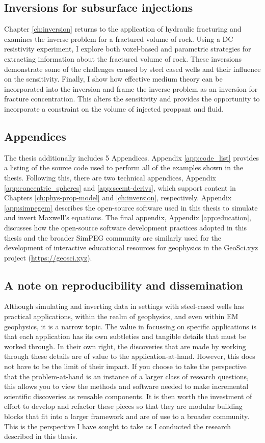 \subsection{Inversions for subsurface injections}
Chapter \ref{ch:inversion} returns to the application of hydraulic fracturing and examines the inverse problem for a fractured volume of rock. Using a DC resistivity experiment, I explore both voxel-based and parametric strategies for extracting information about the fractured volume of rock. These inversions demonstrate some of the challenges caused by steel cased wells and their influence on the sensitivity. Finally, I show how effective medium theory can be incorporated into the inversion and frame the inverse problem as an inversion for fracture concentration. This alters the sensitivity and provides the opportunity to incorporate a constraint on the volume of injected proppant and fluid.

\subsection{Appendices}
The thesis additionally includes 5 Appendices. Appendix \ref{app:code_list} provides a listing of the source code used to perform all of the examples shown in the thesis. Following this, there are two technical appendices, Appendix \ref{app:concentric_spheres} and \ref{app:scemt-derivs}, which support content in Chapters \ref{ch:phys-prop-model} and \ref{ch:inversion}, respectively. Appendix \ref{app:simpegem} describes the open-source software used in this thesis to simulate and invert Maxwell's equations. The final appendix, Appendix \ref{app:education}, discusses how the open-source software development practices adopted in this thesis and the broader SimPEG community are similarly used for the development of interactive educational resources for geophysics in the GeoSci.xyz project (\href{https://geosci.xyz}{https://geosci.xyz}).


\subsection{A note on reproducibility and dissemination}

Although simulating and inverting data in settings with steel-cased wells has practical applications, within the realm of geophysics, and even within EM geophysics, it is a narrow topic. The value in focussing on specific applications is that each application has its own subtleties and tangible details that must be worked through. In their own right, the discoveries that are made by working through these details are of value to the application-at-hand. However, this does not have to be the limit of their impact. If you choose to take the perspective that the problem-at-hand is an instance of a larger class of research questions, this allows you to view the methods and software needed to make incremental scientific discoveries as reusable components. It is then worth the investment of effort to develop and refactor these pieces so that they are modular building blocks that fit into a larger framework and are of use to a broader community. This is the perspective I have sought to take as I conducted the research described in this thesis.

